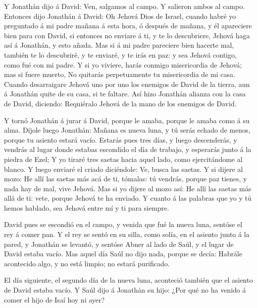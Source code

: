  Y Jonathán dijo á David: Ven, salgamos al campo. Y
salieron ambos al campo.  Entonces dijo Jonathán á David:
Oh Jehová Dios de Israel, cuando habré yo preguntado á mi padre mañana á
esta hora, ó después de mañana, y él apareciere bien para con David, si
entonces no enviare á ti, y te lo descubriere,  Jehová haga
así á Jonathán, y esto añada. Mas si á mi padre pareciere bien hacerte
mal, también te lo descubriré, y te enviaré, y te irás en paz: y sea
Jehová contigo, como fué con mi padre.  Y si yo viviere,
harás conmigo misericordia de Jehová; mas si fuere muerto, 
No quitarás perpetuamente tu misericordia de mi casa. Cuando
desarraigare Jehová uno por uno los enemigos de David de la tierra, aun
á Jonathán quite de su casa, si te faltare.  Así hizo
Jonathán alianza con la casa de David, diciendo: Requiéralo Jehová de la
mano de los enemigos de David.

 Y tornó Jonathán á jurar á David, porque le amaba, porque
le amaba como á su alma.  Díjole luego Jonathán: Mañana es
nueva luna, y tú serás echado de menos, porque tu asiento estará vacío.
 Estarás pues tres días, y luego descenderás, y vendrás al
lugar donde estabas escondido el día de trabajo, y esperarás junto á la
piedra de Ezel;  Y yo tiraré tres saetas hacia aquel lado,
como ejercitándome al blanco.  Y luego enviaré el criado
diciéndole: Ve, busca las saetas. Y si dijere al mozo: He allí las
saetas más acá de ti, tómalas: tú vendrás, porque paz tienes, y nada hay
de mal, vive Jehová.  Mas si yo dijere al mozo así: He allí
las saetas más allá de ti: vete, porque Jehová te ha enviado.
 Y cuanto á las palabras que yo y tú hemos hablado, sea
Jehová entre mí y ti para siempre.

 David pues se escondió en el campo, y venida que fué la
nueva luna, sentóse el rey á comer pan.  Y el rey se sentó
en su silla, como solía, en el asiento junto á la pared, y Jonathán se
levantó, y sentóse Abner al lado de Saúl, y el lugar de David estaba
vacío.  Mas aquel día Saúl no dijo nada, porque se decía:
Habrále acontecido algo, y no está limpio; no estará purificado.

 El día siguiente, el segundo día de la nueva luna,
aconteció también que el asiento de David estaba vacío. Y Saúl dijo á
Jonathán su hijo: ¿Por qué no ha venido á comer el hijo de Isaí hoy ni
ayer?

